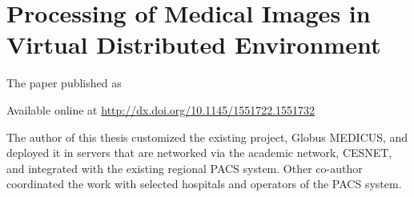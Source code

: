 

\chapter{Processing of Medical Images in Virtual Distributed Environment}\label{app:processing}
The paper \cite{kulhanek2009} published as
 

Available online at \url{http://dx.doi.org/10.1145/1551722.1551732}

The author of this thesis customized the existing project, Globus MEDICUS, and deployed it in servers that are networked via the academic network, CESNET, and integrated with the existing regional PACS system. Other co-author coordinated the work with selected hospitals and operators of the PACS system.

%
